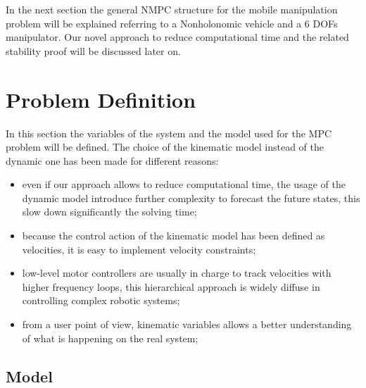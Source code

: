 In the next section the general NMPC structure for the mobile manipulation problem will be explained referring to a Nonholonomic vehicle and a 6 DOFs manipulator. Our novel approach to reduce computational time and the related stability proof will be discussed later on.

\section{Problem Definition}

In this section the variables of the system and the model used for the MPC problem will be defined. The choice of the kinematic model instead of the dynamic one has been made for different reasons:

\begin{itemize}
\item even if our approach allows to reduce computational time, the usage of the dynamic model introduce further complexity to forecast the future states, this slow down significantly the solving time;
\item because the control action of the kinematic model has been defined as velocities, it is easy to implement velocity constraints;
\item low-level motor controllers are usually in charge to track velocities with higher frequency loops, this hierarchical approach is widely diffuse in controlling complex robotic systems;
\item from a user point of view, kinematic variables allows a better understanding of what is happening on the real system;
\end{itemize}

\subsection{Model}

